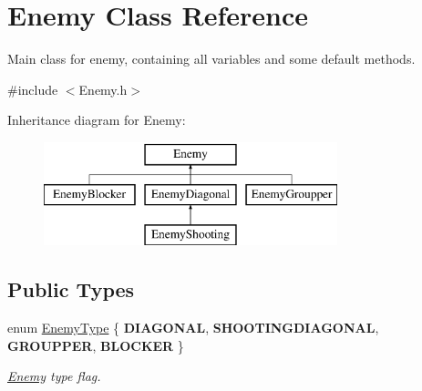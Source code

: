 \hypertarget{class_enemy}{}\section{Enemy Class Reference}
\label{class_enemy}


Main class for enemy, containing all variables and some default methods.  




{\ttfamily \#include $<$Enemy.\+h$>$}

Inheritance diagram for Enemy\+:\begin{figure}[H]
\begin{center}
\leavevmode
\includegraphics[height=3.000000cm]{class_enemy}
\end{center}
\end{figure}
\subsection*{Public Types}
\begin{DoxyCompactItemize}
\item 
\mbox{\label{class_enemy_a98c2ee2c2081001de17a4bc9fa8da94f}} 
enum \hyperlink{class_enemy_a98c2ee2c2081001de17a4bc9fa8da94f}{Enemy\+Type} \{ {\bfseries D\+I\+A\+G\+O\+N\+AL}, 
{\bfseries S\+H\+O\+O\+T\+I\+N\+G\+D\+I\+A\+G\+O\+N\+AL}, 
{\bfseries G\+R\+O\+U\+P\+P\+ER}, 
{\bfseries B\+L\+O\+C\+K\+ER}
 \}\begin{DoxyCompactList}\small\item\em \hyperlink{class_enemy}{Enemy} type flag. \end{DoxyCompactList}
\end{DoxyCompactItemize}
